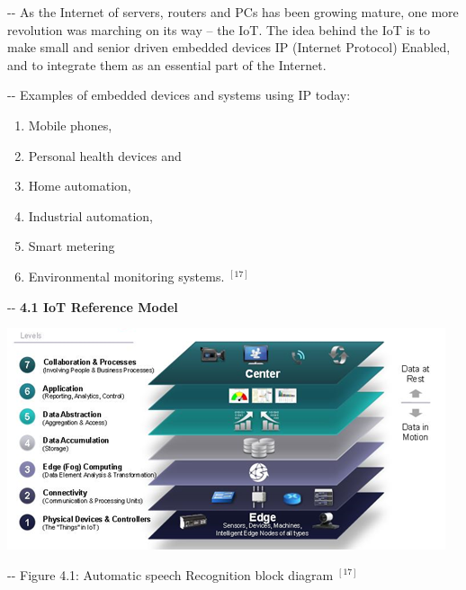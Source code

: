 \documentclass[12pt]{article}
\makeatletter
\newenvironment{indentation}[3]%
	{\par\setlength{\parindent}{#3}
	\setlength{\leftmargin}{#1}       \setlength{\rightmargin}{#2}%
	\advance\linewidth -\leftmargin       \advance\linewidth -\rightmargin%
	\advance\@totalleftmargin\leftmargin  \@setpar{{\@@par}}%
	\parshape 1\@totalleftmargin \linewidth\ignorespaces}{\par}%
\makeatother
\begin{document}
\begin{indentation}{0pt}{0pt}{0pt}
As the Internet of servers, routers and PCs has been growing mature, one more
revolution was marching on its way -- the IoT. The idea behind the IoT is to make
small and senior driven embedded devices IP (Internet Protocol) Enabled, and to
integrate them as an essential part of the Internet.
\end{indentation}

\begin{indentation}{0pt}{0pt}{0pt}
Examples of embedded devices and systems using IP today:
\end{indentation}

\begin{enumerate}
	\item Mobile phones,
	\item Personal health devices and
	\item Home automation,
	\item Industrial automation,
	\item Smart metering
	\item Environmental monitoring systems.
$^{[17]}$

\end{enumerate}

\begin{indentation}{0pt}{0pt}{0pt}
\textbf{{\large 4.1 IoT Reference Model}}
\end{indentation}
\includegraphics[width=365pt]{img-4.png}
\begin{center}
\begin{indentation}{0pt}{0pt}{0pt}
Figure 4.1: Automatic speech Recognition block diagram $^{[17]}$

\end{indentation}
\end{center}
\end{document}
